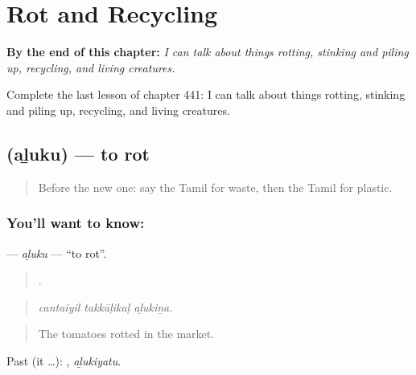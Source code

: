
\chapter{Rot and Recycling}
\label{ch:ta-rot-and-recycling}

\begin{chapteropening}
\textbf{By the end of this chapter:} \emph{I can talk about things rotting, stinking and piling up, recycling, and living creatures.}

Complete the last lesson of chapter 441: I can talk about things rotting, stinking and piling up, recycling, and living creatures.
\end{chapteropening}

\section[\texorpdfstring{\ta{அழுகு} (aḻuku)}{அழுகு (aḻuku)}]{ (aḻuku) — to rot}

\label{lesson:TA-C441-aluku}



\begin{quote}
Before the new one: say the Tamil for waste, then the Tamil for plastic.
\end{quote}

\subsection*{You'll want to know: }
\textbf{} — \emph{aḻuku} — \textquotedblleft{}to rot\textquotedblright{}.

\begin{quote}
  .
\end{quote}

\begin{quote}
\emph{cantaiyil takkāḷikaḷ aḻukiṉa.}
\end{quote}

\begin{quote}
The tomatoes rotted in the market.
\end{quote}

Past (it …): , \emph{aḻukiyatu}.

